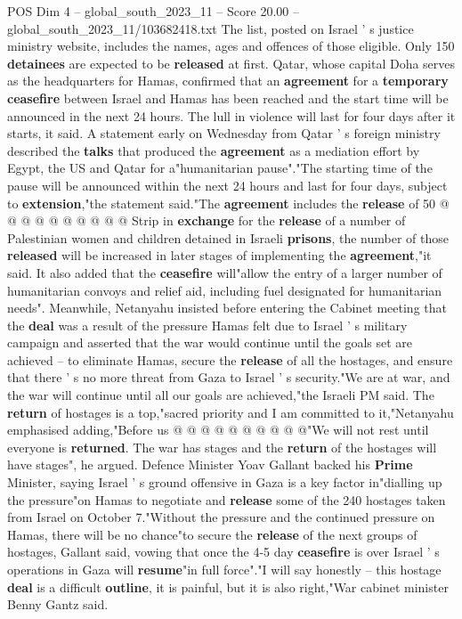\begin{textsample}{POS Dim 4 – global\_south\_2023\_11 – Score 20.00 – global\_south\_2023\_11/103682418.txt}
The list, posted on Israel ' s justice ministry website, includes the names, ages and offences of those eligible.
Only 150 \textbf{detainees} are expected to be \textbf{released} at first.
Qatar, whose capital Doha serves as the headquarters for Hamas, confirmed that an \textbf{agreement} for a \textbf{temporary} \textbf{ceasefire} between Israel and Hamas has been reached and the start time will be announced in the next 24 hours.
The lull in violence will last for four days after it starts, it said.
A statement early on Wednesday from Qatar ' s foreign ministry described the \textbf{talks} that produced the \textbf{agreement} as a mediation effort by Egypt, the US and Qatar for a"humanitarian pause"."The starting time of the pause will be announced within the next 24 hours and last for four days, subject to \textbf{extension},"the statement said."The \textbf{agreement} includes the \textbf{release} of 50 @ @ @ @ @ @ @ @ @ @ Strip in \textbf{exchange} for the \textbf{release} of a number of Palestinian women and children detained in Israeli \textbf{prisons}, the number of those \textbf{released} will be increased in later stages of implementing the \textbf{agreement},"it said.
It also added that the \textbf{ceasefire} will"allow the entry of a larger number of humanitarian convoys and relief aid, including fuel designated for humanitarian needs".
Meanwhile, Netanyahu insisted before entering the Cabinet meeting that the \textbf{deal} was a result of the pressure Hamas felt due to Israel ' s military campaign and asserted that the war would continue until the goals set are achieved -- to eliminate Hamas, secure the \textbf{release} of all the hostages, and ensure that there ' s no more threat from Gaza to Israel ' s security."We are at war, and the war will continue until all our goals are achieved,"the Israeli PM said.
The \textbf{return} of hostages is a top,"sacred priority and I am committed to it,"Netanyahu emphasised adding,"Before us @ @ @ @ @ @ @ @ @ @"We will not rest until everyone is \textbf{returned}.
The war has stages and the \textbf{return} of the hostages will have stages", he argued.
Defence Minister Yoav Gallant backed his \textbf{Prime} Minister, saying Israel ' s ground offensive in Gaza is a key factor in"dialling up the pressure"on Hamas to negotiate and \textbf{release} some of the 240 hostages taken from Israel on October 7."Without the pressure and the continued pressure on Hamas, there will be no chance"to secure the \textbf{release} of the next groups of hostages, Gallant said, vowing that once the 4-5 day \textbf{ceasefire} is over Israel ' s operations in Gaza will \textbf{resume}"in full force"."I will say honestly -- this hostage \textbf{deal} is a difficult \textbf{outline}, it is painful, but it is also right,"War cabinet minister Benny Gantz said.

\end{textsample}
